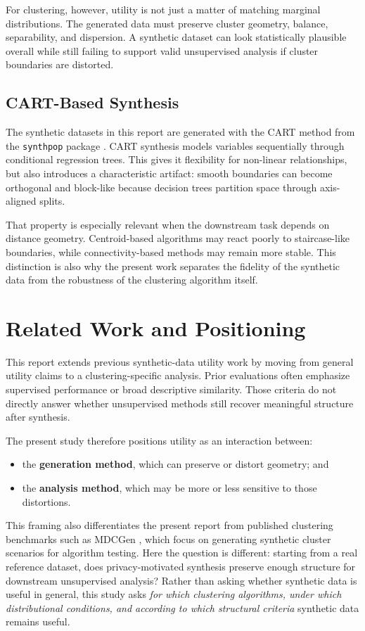 For clustering, however, utility is not just a matter of matching marginal distributions. The generated data must preserve cluster geometry, balance, separability, and dispersion. A synthetic dataset can look statistically plausible overall while still failing to support valid unsupervised analysis if cluster boundaries are distorted.

\subsection{CART-Based Synthesis}
The synthetic datasets in this report are generated with the CART method from the \texttt{synthpop} package \cite{nowok2016}. CART synthesis models variables sequentially through conditional regression trees. This gives it flexibility for non-linear relationships, but also introduces a characteristic artifact: smooth boundaries can become orthogonal and block-like because decision trees partition space through axis-aligned splits.

That property is especially relevant when the downstream task depends on distance geometry. Centroid-based algorithms may react poorly to staircase-like boundaries, while connectivity-based methods may remain more stable. This distinction is also why the present work separates the fidelity of the synthetic data from the robustness of the clustering algorithm itself.

\section{Related Work and Positioning}
\label{sec:related-work}

This report extends previous synthetic-data utility work by moving from general utility claims to a clustering-specific analysis. Prior evaluations often emphasize supervised performance or broad descriptive similarity. Those criteria do not directly answer whether unsupervised methods still recover meaningful structure after synthesis.

The present study therefore positions utility as an interaction between:
\begin{itemize}
  \item the \textbf{generation method}, which can preserve or distort geometry; and
  \item the \textbf{analysis method}, which may be more or less sensitive to those distortions.
\end{itemize}

This framing also differentiates the present report from published clustering benchmarks such as MDCGen \cite{iglesias2019}, which focus on generating synthetic cluster scenarios for algorithm testing. Here the question is different: starting from a real reference dataset, does privacy-motivated synthesis preserve enough structure for downstream unsupervised analysis? Rather than asking whether synthetic data is useful in general, this study asks \textit{for which clustering algorithms, under which distributional conditions, and according to which structural criteria} synthetic data remains useful.
